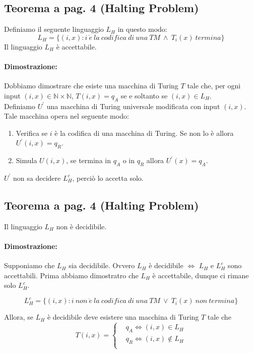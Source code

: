 \subsection{Teorema a pag. 4 (Halting Problem)}

Definiamo il seguente linguaggio $L_{H}$ in questo modo:
$$L_{H} = \{(i, x): i\ \grave{e}\ la\ codifica\ di\ una\ TM\ \land\ T_{i}(x)\ termina\}$$
Il linguaggio $L_{H}$ è accettabile.

\paragraph*{Dimostrazione:} Dobbiamo dimostrare che esiste una macchina di Turing $T$ tale che, per ogni
input $(i, x ) \in \mathbb{N} \times \mathbb{N}$, $T(i, x) = q_{A}$ se e soltanto se $(i, x) \in L_{H}$.\\ 
Definiamo $U^{'}$ una macchina di Turing universale modificata con input $(i, x)$.
Tale macchina opera nel seguente modo:
\begin{enumerate}
    \item Verifica se $i$ è la codifica di una macchina di Turing. Se non lo è allora $U^{'}(i, x) = q_{R}$.
    \item Simula $U(i, x)$, se termina in $q_{A}$ o in $q_{R}$ allora $U^{'}(x) = q_{A}$.
\end{enumerate}

$U^{'}$ non sa decidere $L_{H}^{c}$, perciò lo accetta solo.

\subsection{Teorema a pag. 4 (Halting Problem)}

Il linguaggio $L_{H}$ non è decidibile.


\paragraph*{Dimostrazione:} Supponiamo che $L_{H}$ sia decidibile. Ovvero $L_{H}$ è decidibile $\Leftrightarrow$ $L_{H}$ e $L_{H}^c$
sono accettabili. Prima abbiamo dimostratro che $L_{H}$ è accettabile, dunque ci rimane solo $L_{H}^c$.

\[
    L_{H}^c = \{(i, x): i\ non\ \grave{e}\ la\ codifica\ di\ una\ TM\ \lor\ T_{i}(x)\ non\ termina\}
\]

Allora, se $L_{H}$ è decidibile deve esistere una macchina di Turing $T$ tale che
\[
    T(i, x) = 
    \begin{cases} 
        & q_{A} \Leftrightarrow (i, x)\in L_{H}\\
        & q_{R} \Leftrightarrow (i, x)\notin L_{H}\\
    \end{cases}
\]

